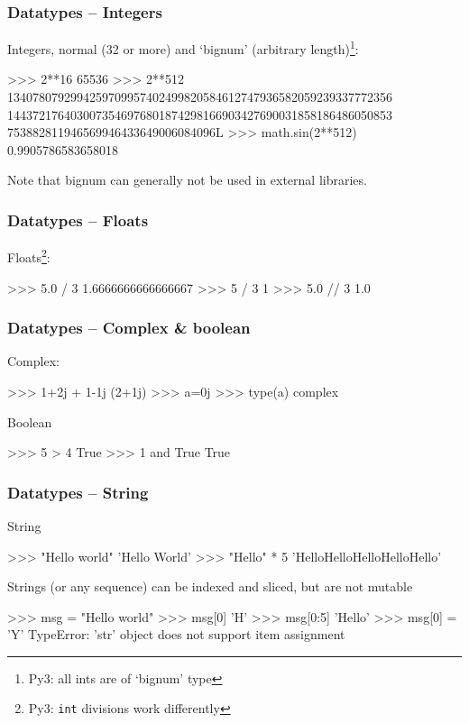 \documentclass[xetex,10pt]{beamer}
\def\pythoni{\lstinline[language=pythontim]}
\def\spacer{\vspace*{1em}}
\newcommand{\pypypy}[1]{\footnote[frame]{Py3: #1}}
\begin{document}
\begin{frame}[fragile]
	\frametitle{Datatypes -- Integers}

	Integers, normal (32 or more) and `bignum' (arbitrary length)\pypypy{all ints are of `bignum' type}:

	\spacer

\begin{python}
>>> 2**16
65536
>>> 2**512
1340780792994259709957402499820584612747936582059239337772356
1443721764030073546976801874298166903427690031858186486050853
753882811946569946433649006084096L
>>> math.sin(2**512)
0.9905786583658018
\end{python}

	\spacer

Note that bignum can generally not be used in external libraries.
\end{frame}


\begin{frame}[fragile]
	\frametitle{Datatypes -- Floats}

Floats\pypypy{\pythoni{int} divisions work differently}:
\begin{python}
>>> 5.0 / 3
1.6666666666666667
>>> 5 / 3
1
>>> 5.0 // 3
1.0
\end{python}
\end{frame}


\begin{frame}[fragile]
	\frametitle{Datatypes -- Complex \& boolean}

Complex:
\begin{python}
>>> 1+2j + 1-1j
(2+1j)
>>> a=0j
>>> type(a)
complex
\end{python}

	\spacer

Boolean
\begin{python}
>>> 5 > 4
True
>>> 1 and True
True
\end{python}

\end{frame}


\begin{frame}[fragile]
	\frametitle{Datatypes -- String}

String
\begin{python}
>>> "Hello world"
'Hello World'
>>> "Hello" * 5
'HelloHelloHelloHelloHello'
\end{python}

	\spacer
\pause
	
Strings (or any sequence) can be indexed and sliced, but are not mutable
\begin{python}
>>> msg = "Hello world"
>>> msg[0]
'H'
>>> msg[0:5]
'Hello'
>>> msg[0] = 'Y'
TypeError: 'str' object does not support item assignment
\end{python}
\end{frame}
\end{document}
